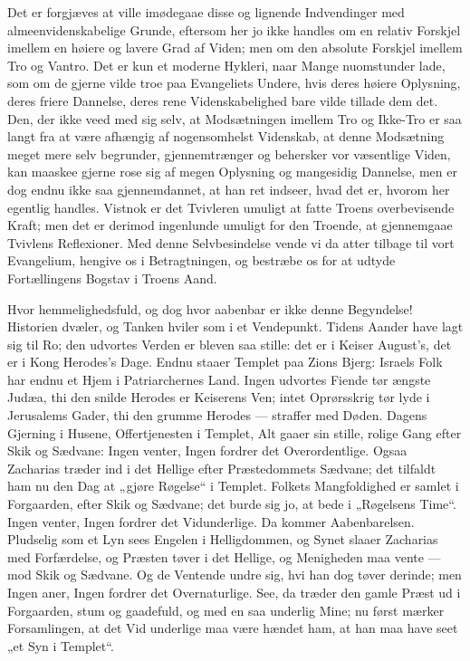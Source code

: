 \documentclass[12pt,a4paper]{book}
\begin{document}
Det er forgjæves at ville imødegaae disse og lignende Indvendinger
med almeenvidenskabelige Grunde, eftersom her jo ikke handles om
en relativ Forskjel imellem en høiere og lavere Grad af Viden; men
om den absolute Forskjel imellem Tro og Vantro. Det er kun et
moderne Hykleri, naar Mange nuomstunder lade, som om de gjerne
vilde troe paa Evangeliets Undere, hvis deres høiere Oplysning,
deres friere Dannelse, deres rene Videnskabelighed bare vilde
tillade dem det. Den, der ikke veed med sig selv, at
Modsætningen imellem Tro og Ikke-Tro er saa langt fra at være
afhængig af nogensomhelst Videnskab, at denne Modsætning meget
mere selv begrunder, gjennemtrænger og behersker vor væsentlige
Viden, kan maaskee gjerne rose sig af megen Oplysning og
mangesidig Dannelse, men er dog endnu ikke saa gjennemdannet, at
han ret indseer, hvad det er, hvorom her egentlig handles.
Vistnok er det Tvivleren umuligt at fatte Troens overbevisende
Kraft; men det er derimod ingenlunde umuligt for den Troende, at
gjennemgaae Tvivlens Reflexioner. Med denne Selvbesindelse vende
vi da atter tilbage til vort Evangelium, hengive os i
Betragtningen, og bestræbe os for at udtyde Fortællingens Bogstav
i Troens Aand.

Hvor hemmelighedsfuld, og dog hvor aabenbar er ikke denne
Begyndelse! Historien dvæler, og Tanken hviler som i et
Vendepunkt. Tidens Aander have lagt sig til Ro; den udvortes
Verden er bleven saa stille: det er i Keiser August's, det er i
Kong Herodes's Dage. Endnu staaer Templet paa Zions Bjerg:
Israels Folk har endnu et Hjem i Patriarchernes Land. Ingen
udvortes Fiende tør ængste Judæa, thi den snilde Herodes er
Keiserens Ven; intet Oprørsskrig tør lyde i Jerusalems Gader, thi
den grumme Herodes --- straffer med Døden. Dagens Gjerning i
Husene, Offertjenesten i Templet, Alt gaaer sin stille, rolige
Gang efter Skik og Sædvane: Ingen venter, Ingen fordrer det
Overordentlige. Ogsaa Zacharias træder ind i det Hellige efter
Præstedommets Sædvane; det tilfaldt ham nu den Dag at „gjøre
Røgelse“ i Templet. Folkets Mangfoldighed er samlet i Forgaarden,
efter Skik og Sædvane; det burde sig jo, at bede i „Røgelsens
Time“. Ingen venter, Ingen fordrer det Vidunderlige. Da kommer
Aabenbarelsen. Pludselig som et Lyn sees Engelen i Helligdommen,
og Synet slaaer Zacharias med Forfærdelse, og Præsten tøver i det
Hellige, og Menigheden maa vente --- mod Skik og Sædvane. Og de
Ventende undre sig, hvi han dog tøver derinde; men Ingen aner,
Ingen fordrer det Overnaturlige. See, da træder den gamle Præst
ud i Forgaarden, stum og gaadefuld, og med en saa underlig Mine;
nu først mærker Forsamlingen, at det Vid\-%
underlige maa være hændet ham, at han maa have seet „et Syn i
Templet“.
\end{document}
